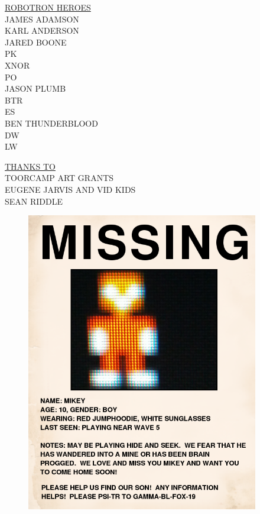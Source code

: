 \documentclass{amsbook}
\begin{document}
\clearpage
\begin{center}
\linespread{1.2}
    {\ROBOFONT    \underline{ROBOTRON HEROES} \\
    \vspace{22pt}
    JAMES ADAMSON\\
    KARL ANDERSON\\
    JARED BOONE\\
    PK\\
    XNOR\\
    PO\\
    JASON PLUMB\\
    BTR\\
    ES\\
    BEN THUNDERBLOOD\\
    DW\\
    LW\\}

    \vspace{32pt}
    {\ROBOFONTy    \underline{THANKS TO} \\
    \vspace{12pt}
    TOORCAMP ART GRANTS\\
    EUGENE JARVIS AND VID KIDS\\
    SEAN RIDDLE
    }
\end{center}
\clearpage

\begin{figure}[h]
  \includegraphics[width=4in]{../missing01.png}
\end{figure}
\end{document}
